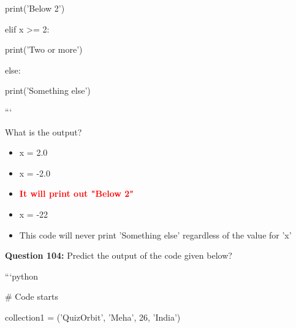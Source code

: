 \documentclass[12pt,a4paper]{article}
\begin{document}
\newline
    print('Below 2')\newline

\newline
elif x >= 2:\newline

\newline
    print('Two or more')\newline

\newline
else:\newline

\newline
    print('Something else')\newline

\newline
```\newline

\newline
\newline

\newline
What is the output?

\begin{itemize}
    \item[\textbf{A.}] x = 2.0
    \item[\textbf{B.}] x = -2.0
    \item[\textbf{C.}] \textcolor{red}{\textbf{It will print out "Below 2"}}
    \item[\textbf{D.}] x = -22
    \item[\textbf{E.}] This code will never print 'Something else' regardless of the value for 'x'
\end{itemize}

\vspace{0.5cm}

\textbf{Question 104:} Predict the output of the code given below?\newline

\newline
\newline

\newline
```python\newline

\newline
# Code starts\newline

\newline
collection1 = ('QuizOrbit', 'Meha', 26, 'India')\newline
\end{document}
